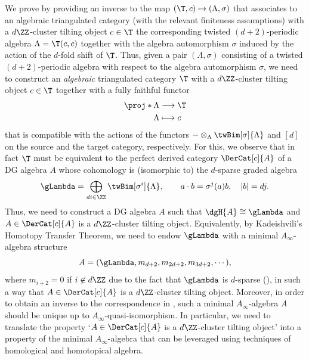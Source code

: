 \documentclass[a4paper]{amsart}
\begin{document}
We prove  by providing an inverse to the
map $(\T,c)\mapsto(\Lambda,\sigma)$ that associates to an algebraic triangulated category
(with the relevant finiteness assumptions) with a $d\ZZ$-cluster tilting object
$c\in\T$ the corresponding twisted $(d+2)$-periodic algebra $\Lambda=\T(c,c)$
together with the algebra automorphism $\sigma$ induced by the action of the
$d$-fold shift of $\T$. Thus, given a pair $(\Lambda,\sigma)$ consisting of a
twisted $(d+2)$-periodic algebra with respect to the algebra automorphism
$\sigma$, we need to construct an \emph{algebraic} triangulated category $\T$
with a $d\ZZ$-cluster tilting object $c\in\T$ together with a fully faithful functor
\begin{align*}
  \proj*{\Lambda}&\longrightarrow\T\\
  \Lambda&\longmapsto c
\end{align*}
that is compatible with the actions of the functors
$-\otimes_\Lambda\twBim[\sigma]{\Lambda}$ and $[d]$ on the source and the target
category, respectively. For this, we observe that in fact $\T$ must be
equivalent to the perfect derived category $\DerCat[c]{A}$ of a DG algebra $A$ whose
cohomology is (isomorphic to) the $d$-sparse graded algebra
\[
  \gLambda=\bigoplus_{di\in\ZZ}\twBim[\sigma^i]{\Lambda},\qquad a\cdot b=\sigma^j(a)b,\quad |b|=dj.
\]
Thus, we need to construct a DG algebra $A$ such that $\dgH{A}\cong\gLambda$ and
${A\in\DerCat[c]{A}}$ is a $d\ZZ$-cluster tilting object. Equivalently, by
Kadeishvili's Homotopy Transfer Theorem, we need to endow $\gLambda$ with a minimal
$A_\infty$-algebra structure
\[
  A=(\gLambda,m_{d+2},m_{2d+2},m_{3d+2},\cdots),
\]
where $m_{i+2}=0$ if $i\not\in d\ZZ$ due to the fact that $\gLambda$ is
$d$-sparse (), in such a way that
$A\in\DerCat[c]{A}$ is a $d\ZZ$-cluster tilting object. Moreover, in order to
obtain an inverse to the correspondence in
, such a minimal $A_\infty$-algebra $A$
should be unique up to $A_\infty$-quasi-isomorphism. In particular, we need to
translate the property `$A\in\DerCat[c]{A}$ is a $d\ZZ$-cluster tilting object'
into a property of the minimal $A_\infty$-algebra that can be leveraged using
techniques of homological and homotopical algebra.
\end{document}
